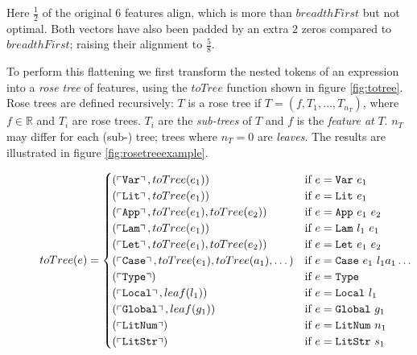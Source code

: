 Here $\frac{1}{2}$ of the original 6 features align, which is more than $breadthFirst$ but not optimal. Both vectors have also been padded by an extra 2 zeros compared to $breadthFirst$; raising their alignment to $\frac{5}{8}$.

To perform this flattening we first transform the nested tokens of an expression into a \emph{rose tree} of features, using the $toTree$ function shown in figure \ref{fig:totree}. Rose trees are defined recursively: $T$ is a rose tree if $T = (f, T_1, \dots, T_{n_T})$, where $f \in \mathbb{R}$ and $T_i$ are rose trees. $T_i$ are the \emph{sub-trees} of $T$ and $f$ is the \emph{feature at} $T$. $n_T$ may differ for each (sub-) tree; trees where $n_T = 0$ are \emph{leaves}. The results are illustrated in figure \ref{fig:rosetreeexample}.

\begin{figure}
  \begin{align*}
    toTree(e) &=
    \begin{cases}
      (\left\ulcorner \texttt{Var} \right\urcorner,     toTree(e_1))                                 & \text{if $e = \texttt{Var}\ e_1$} \\
      (\left\ulcorner \texttt{Lit} \right\urcorner,     toTree(e_1))                                 & \text{if $e = \texttt{Lit}\ e_1$} \\
      (\left\ulcorner \texttt{App} \right\urcorner,     toTree(e_1), toTree(e_2))                    & \text{if $e = \texttt{App}\ e_1\ e_2$} \\
      (\left\ulcorner \texttt{Lam} \right\urcorner,     toTree(e_1))                                 & \text{if $e = \texttt{Lam}\ l_1\ e_1$} \\
      (\left\ulcorner \texttt{Let} \right\urcorner,     toTree(e_1), toTree(e_2))                    & \text{if $e = \texttt{Let}\ e_1\ e_2$} \\
      (\left\ulcorner \texttt{Case} \right\urcorner,    toTree(e_1), toTree(a_1), \dots)             & \text{if $e = \texttt{Case}\ e_1\ l_1 a_1 \dots$} \\
      (\left\ulcorner \texttt{Type} \right\urcorner)                                                & \text{if $e = \texttt{Type}$} \\
      (\left\ulcorner \texttt{Local} \right\urcorner,   leaf(l_1))                                  & \text{if $e = \texttt{Local}\ l_1$} \\
      (\left\ulcorner \texttt{Global} \right\urcorner,  leaf(g_1))                                  & \text{if $e = \texttt{Global}\ g_1$} \\
      (\left\ulcorner \texttt{LitNum} \right\urcorner)                                              & \text{if $e = \texttt{LitNum}\ n_1$} \\
      (\left\ulcorner \texttt{LitStr} \right\urcorner)                                              & \text{if $e = \texttt{LitStr}\ s_1$} \\

\end{cases}
\end{align*}
\end{figure}
